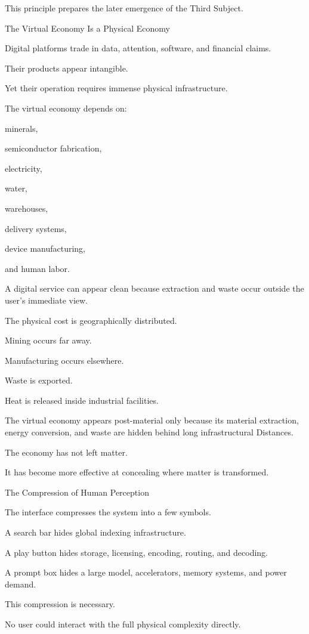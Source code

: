 This principle prepares the later emergence of the Third Subject.

The Virtual Economy Is a Physical Economy

Digital platforms trade in data, attention, software, and financial claims.

Their products appear intangible.

Yet their operation requires immense physical infrastructure.

The virtual economy depends on:

minerals,

semiconductor fabrication,

electricity,

water,

warehouses,

delivery systems,

device manufacturing,

and human labor.

A digital service can appear clean because extraction and waste occur outside the user’s immediate view.

The physical cost is geographically distributed.

Mining occurs far away.

Manufacturing occurs elsewhere.

Waste is exported.

Heat is released inside industrial facilities.

The virtual economy appears post-material only because its material extraction, energy conversion, and waste are hidden behind long infrastructural Distances.

The economy has not left matter.

It has become more effective at concealing where matter is transformed.

The Compression of Human Perception

The interface compresses the system into a few symbols.

A search bar hides global indexing infrastructure.

A play button hides storage, licensing, encoding, routing, and decoding.

A prompt box hides a large model, accelerators, memory systems, and power demand.

This compression is necessary.

No user could interact with the full physical complexity directly.


